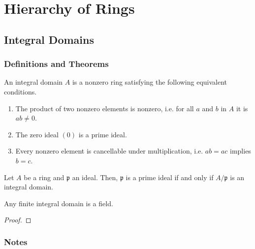 \chapter{Hierarchy of Rings}

\newpage
\section{Integral Domains}
\subsection*{Definitions and Theorems}
\begin{defbox}
    \begin{definition}
        An integral domain \(A\) is a nonzero ring satisfying the following equivalent conditions.
        \begin{enumerate}
            \item The product of two nonzero elements is nonzero, i.e. for all \(a\) and \(b\) in \(A\) it is \(ab \neq 0\).
            \item The zero ideal \((0)\) is a prime ideal.
            \item Every nonzero element is cancellable under multiplication, i.e. \(ab = ac\) implies \(b = c\).
        \end{enumerate}
    \end{definition}
\end{defbox}

\begin{thmbox}
    \begin{lemma}
        Let \(A\) be a ring and \(\mathfrak{p}\) an ideal. Then, \(\mathfrak{p}\) is a prime ideal if and only if \(A / \mathfrak{p}\) is an integral domain.
    \end{lemma}
\end{thmbox}

\begin{thmbox}
    \begin{proposition}
        Any finite integral domain is a field.
    \end{proposition}
\end{thmbox}
\begin{proof}
    
\end{proof}

\subsection*{Notes}

